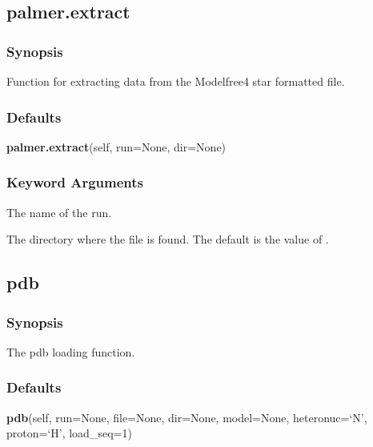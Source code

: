   

 \newpage 

 \subsection{palmer.extract} 

  
 \subsubsection{Synopsis} 

 Function for extracting data from the Modelfree4  star formatted file. 
  

  
 \subsubsection{Defaults} 

 \textsf{\textbf{palmer.extract}(self, run=None, dir=None)} 

  
 \subsubsection{Keyword Arguments} 

   The name of the run.   

   The directory where the file  is found.  The default is the value of .  

  

  

 \newpage 

 \subsection{pdb} 

  
 \subsubsection{Synopsis} 

 The pdb loading function. 
  

  
 \subsubsection{Defaults} 

 \textsf{\textbf{pdb}(self, run=None, file=None, dir=None, model=None, heteronuc=`N', proton=`H', load\_seq=1)} 

